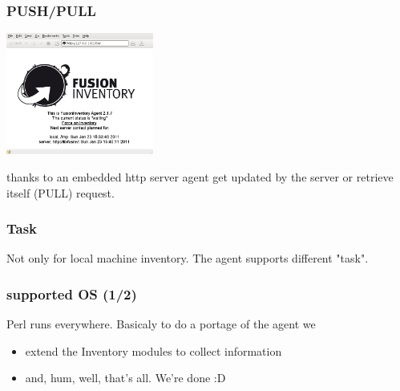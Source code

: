 \begin{frame}
    \frametitle{PUSH/PULL}
    \includegraphics[height=4.0cm]{pics/http-server.png}

    thanks to an embedded http server agent get updated by the server or retrieve itself (PULL) request.
\end{frame}

\begin{frame}
    \frametitle{Task}
    Not only for local machine inventory. The agent supports different "task".
\end{frame}

\begin{frame}
    \frametitle{supported OS (1/2)}
    Perl runs everywhere.
    \pause
    Basicaly to do a portage of the agent we
    \begin{itemize}
        \item extend the Inventory modules to collect information
        \item and, hum, well, that's all. We're done :D
    \end{itemize}
\end{frame}

